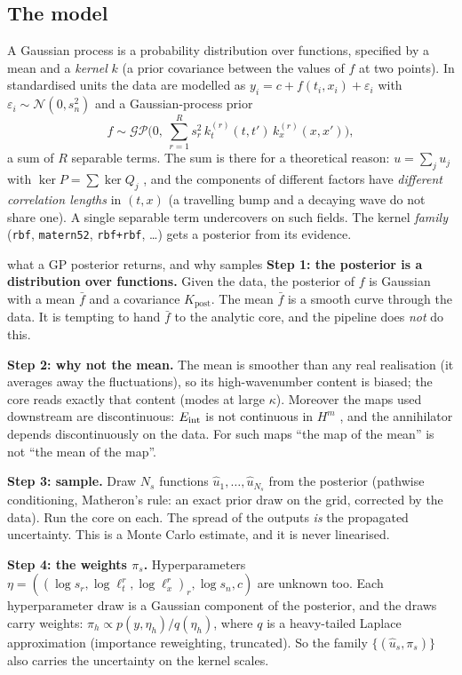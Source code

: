 \subsection{The model}
A Gaussian process is a probability distribution over functions, specified by a mean and a \emph{kernel} $k$ (a prior covariance between the values of $f$ at two points). In standardised units the data are modelled as $y_i=c+f(t_i,x_i)+\varepsilon_i$ with $\varepsilon_i\sim\mathcal N(0,s_n^2)$ and a Gaussian-process prior
\begin{equation}\label{eq:gp}
f\sim\mathcal{GP}\Big(0,\ \sum_{r=1}^{R}s_r^2\,k_t^{(r)}(t,t')\,k_x^{(r)}(x,x')\Big),
\end{equation}
a sum of $R$ separable terms. The sum is there for a theoretical reason: $u=\sum_ju_j$ with $\ker P=\sum\ker Q_j$ , and the components of different factors have \emph{different correlation lengths} in $(t,x)$ (a travelling bump and a decaying wave do not share one). A single separable term undercovers on such fields. The kernel \emph{family} (\texttt{rbf}, \texttt{matern52}, \texttt{rbf+rbf}, \dots) gets a posterior from its evidence.

\begin{explained}{what a GP posterior returns, and why samples}
\textbf{Step 1: the posterior is a distribution over functions.} Given the data, the posterior of $f$ is Gaussian with a mean $\bar f$ and a covariance $K_{\mathrm{post}}$. The mean $\bar f$ is a smooth curve through the data. It is tempting to hand $\bar f$ to the analytic core, and the pipeline does \emph{not} do this.

\medskip\textbf{Step 2: why not the mean.} The mean is smoother than any real realisation (it averages away the fluctuations), so its high-wavenumber content is biased; the core reads exactly that content (modes at large $\kappa$). Moreover the maps used downstream are discontinuous: $E_{\mathrm{int}}$ is not continuous in $H^m$ , and the annihilator depends discontinuously on the data. For such maps ``the map of the mean'' is not ``the mean of the map''.

\medskip\textbf{Step 3: sample.} Draw $N_s$ functions $\hat u_1,\dots,\hat u_{N_s}$ from the posterior (pathwise conditioning, Matheron's rule: an exact prior draw on the grid, corrected by the data). Run the core on each. The spread of the outputs \emph{is} the propagated uncertainty. This is a Monte Carlo estimate, and it is never linearised.

\medskip\textbf{Step 4: the weights $\pi_s$.} Hyperparameters $\eta=((\log s_r,\log\ell_t^r,\log\ell_x^r)_r,\log s_n,c)$ are unknown too. Each hyperparameter draw is a Gaussian component of the posterior, and the draws carry weights: $\pi_h\propto p(y,\eta_h)/q(\eta_h)$, where $q$ is a heavy-tailed Laplace approximation (importance reweighting, truncated). So the family $\{(\hat u_s,\pi_s)\}$ also carries the uncertainty on the kernel scales.
\end{explained}

